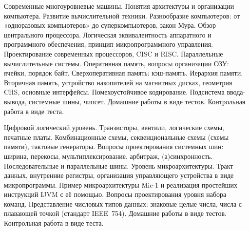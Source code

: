 



\myunit
	{Современные многоуровневые машины. Понятия архитектуры и организации компьютера. Развитие вычислительной техники. Разнообразие компьютеров: от «одноразовых компьютеров» до суперкомпьютеров, закон Мура. Обзор центрального процессора. Логическая эквивалентность аппаратного и программного обеспечения, принцип микропрограммного управления. Проектирование современных процессоров, CISC и RISC. Параллельные вычислительные системы. 
	Оперативная память, вопросы организации ОЗУ: ячейки, порядок байт. Сверхоперативная память: кэш-память. 
	Иерархия памяти. Вторичная память, устройство накопителей на магнитных дисках, геометрия CHS, основные интерфейсы. Помехоустойчивое кодирование. 
	Подсистема ввода-вывода, системные шины, чипсет.}
	{Домашние работы в виде тестов. Контрольная работа в виде теста.}

\myunit
	{Цифровой логический уровень. Транзисторы, вентили, логические схемы, печатные платы. Комбинационные схемы, секвенциональные схемы (схемы памяти), тактовые генераторы. Вопросы проектирования системных шин: ширина, перекосы, мультиплексирование, арбитраж, (а)синхронность. Последовательные и параллельные шины.
	Уровень микроархитектуры. Тракт данных, внутренние регистры, организация управляющего устройства в виде микропрограммы. Пример микроархитектуры Mic-1 и реализация простейших инструкций IJVM с её помощью.
	Вопросы проектирования уровня набора команд. Представление числовых типов данных: знаковые целые числа, числа с плавающей точкой (стандарт IEEE~754).}
	{Домашние работы в виде тестов. Контрольная работа в виде теста.}

\printhours



